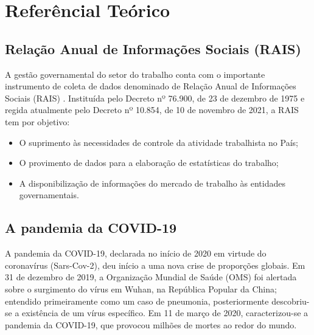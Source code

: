 \section{Referêncial Teórico}

\subsection{Relação Anual de Informações Sociais (RAIS)}

A gestão governamental do setor do trabalho conta com o importante instrumento de coleta de dados denominado de Relação Anual de Informações Sociais (RAIS) \cite{Sobre_a_RAIS}. Instituída pelo Decreto nº 76.900, de 23 de dezembro de 1975 e regida atualmente pelo Decreto nº 10.854, de 10 de novembro de 2021, a RAIS tem por objetivo: 

\begin{itemize}
	\item O suprimento às necessidades de controle da atividade trabalhista no País;
	\item O provimento de dados para a elaboração de estatísticas do trabalho;
	\item A disponibilização de informações do mercado de trabalho às entidades governamentais.
\end{itemize}

\subsection{A pandemia da COVID-19}

A pandemia da COVID-19, declarada no início de 2020 em virtude do coronavírus (Sars-Cov-2), deu início a uma nova crise de proporções globais. Em 31 de dezembro de 2019, a Organização Mundial de Saúde (OMS) foi alertada sobre o surgimento do vírus em Wuhan, na República Popular da China; entendido primeiramente como um caso de pneumonia, posteriormente descobriu-se a existência de um vírus específico. Em 11 de março de 2020, caracterizou-se a pandemia da COVID-19, que provocou milhões de mortes ao redor do mundo. 

